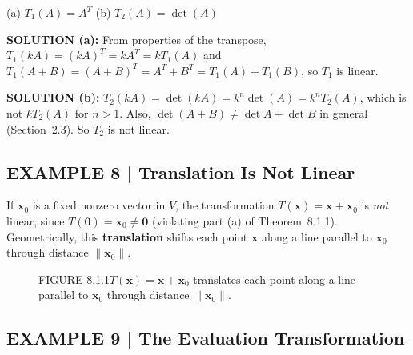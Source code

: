 \documentclass{article}
\begin{document}
\noindent(a) $T_1(A) = A^T$ \quad (b) $T_2(A) = \det(A)$

\textbf{SOLUTION (a):} From properties of the transpose, $T_1(kA) = (kA)^T = kA^T = kT_1(A)$
and $T_1(A+B) = (A+B)^T = A^T+B^T = T_1(A)+T_1(B)$, so $T_1$ is linear.

\textbf{SOLUTION (b):} $T_2(kA) = \det(kA) = k^n\det(A) = k^n T_2(A)$, which is not $kT_2(A)$
for $n>1$. Also, $\det(A+B) \neq \det A + \det B$ in general (Section~2.3). So $T_2$ is not linear.

\subsection*{EXAMPLE 8 | Translation Is Not Linear}

If $\mathbf{x}_0$ is a fixed nonzero vector in $V$, the transformation $T(\mathbf{x}) = \mathbf{x}+\mathbf{x}_0$
is \emph{not} linear, since $T(\mathbf{0}) = \mathbf{x}_0 \neq \mathbf{0}$
(violating part (a) of Theorem~8.1.1). Geometrically, this \textbf{translation} shifts
each point $\mathbf{x}$ along a line parallel to $\mathbf{x}_0$ through distance $\|\mathbf{x}_0\|$.

\begin{figure}[ht]
\centering
{}
\caption*{FIGURE 8.1.1\quad $T(\mathbf{x}) = \mathbf{x}+\mathbf{x}_0$ translates each point along
a line parallel to $\mathbf{x}_0$ through distance $\|\mathbf{x}_0\|$.}
\end{figure}

\subsection*{EXAMPLE 9 | The Evaluation Transformation}
\end{document}
